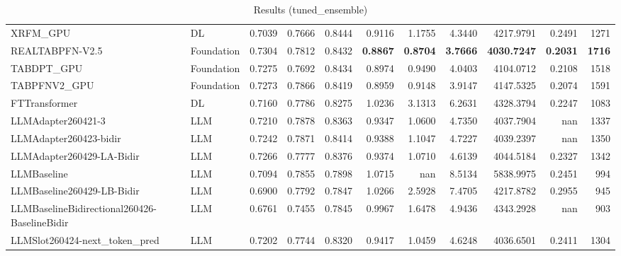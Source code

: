 \begin{table}[htbp]
{\begin{tabular}{ll|rrrrrrrr|r}
XRFM\_GPU & DL & 0.7039 & 0.7666 & 0.8444 & 0.9116 & 1.1755 & 4.3440 & 4217.9791 & 0.2491 & 1271 \\
REALTABPFN-V2.5 & Foundation & 0.7304 & 0.7812 & 0.8432 & \textbf{0.8867} & \textbf{0.8704} & \textbf{3.7666} & \textbf{4030.7247} & \textbf{0.2031} & \textbf{1716} \\
TABDPT\_GPU & Foundation & 0.7275 & 0.7692 & 0.8434 & 0.8974 & 0.9490 & 4.0403 & 4104.0712 & 0.2108 & 1518 \\
TABPFNV2\_GPU & Foundation & 0.7273 & 0.7866 & 0.8419 & 0.8959 & 0.9148 & 3.9147 & 4147.5325 & 0.2074 & 1591 \\
\midrule
FTTransformer & DL & 0.7160 & 0.7786 & 0.8275 & 1.0236 & 3.1313 & 6.2631 & 4328.3794 & 0.2247 & 1083 \\
LLMAdapter260421-3 & LLM & 0.7210 & 0.7878 & 0.8363 & 0.9347 & 1.0600 & 4.7350 & 4037.7904 & nan & 1337 \\
LLMAdapter260423-bidir & LLM & 0.7242 & 0.7871 & 0.8414 & 0.9388 & 1.1047 & 4.7227 & 4039.2397 & nan & 1350 \\
LLMAdapter260429-LA-Bidir & LLM & 0.7266 & 0.7777 & 0.8376 & 0.9374 & 1.0710 & 4.6139 & 4044.5184 & 0.2327 & 1342 \\
LLMBaseline & LLM & 0.7094 & 0.7855 & 0.7898 & 1.0715 & nan & 8.5134 & 5838.9975 & 0.2451 & 994 \\
LLMBaseline260429-LB-Bidir & LLM & 0.6900 & 0.7792 & 0.7847 & 1.0266 & 2.5928 & 7.4705 & 4217.8782 & 0.2955 & 945 \\
LLMBaselineBidirectional260426-BaselineBidir & LLM & 0.6761 & 0.7455 & 0.7845 & 0.9967 & 1.6478 & 4.9436 & 4343.2928 & nan & 903 \\
LLMSlot260424-next\_token\_pred & LLM & 0.7202 & 0.7744 & 0.8320 & 0.9417 & 1.0459 & 4.6248 & 4036.6501 & 0.2411 & 1304 \\
\bottomrule
\end{tabular}
}
\caption{Results (tuned_ensemble)}
\label{tab:results_tuned_ensemble}
\end{table}
